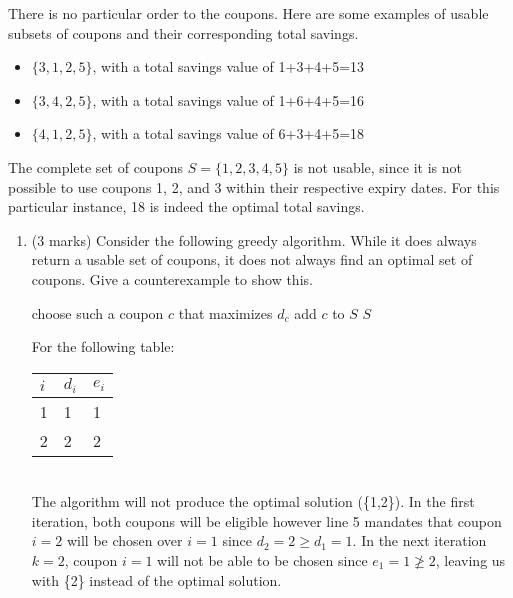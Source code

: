 \documentclass[11pt]{article}
\begin{document}
There is no particular order to the coupons. Here are some examples of usable subsets of coupons and their corresponding total savings. 
\begin{itemize}
    \item[] $\{ 3, 1, 2, 5\}$, with a total savings value of 1+3+4+5=13
    \item[] $\{ 3, 4, 2, 5\}$, with a total savings value of 1+6+4+5=16
    \item[] $\{ 4, 1, 2, 5\}$, with a total savings value of 6+3+4+5=18
\end{itemize}
The complete set of coupons $S = \{1,2,3,4,5\}$ is not usable, since it is not possible to use coupons 1, 2, and 3 within their respective expiry dates. For this particular instance, 18 is indeed the optimal total savings. 

\begin{enumerate}
    \item (3 marks) Consider the following greedy algorithm. While it does always return a usable set of coupons, it does not always find an optimal set of coupons. Give a counterexample to show this. 
    
    \begin{algorithmic}[1]
                    \State choose such a coupon $c$ that maximizes $d_c$
                    \State add $c$ to $S$
                \EndIf
            \EndFor
            \State \Return $S$
        \EndProcedure
    \end{algorithmic}
    
    \begin{soln}
    For the following table:
    \begin{table}[h]
    \centering
    \begin{tabular}{l|ll} 
    $i$ & $d_i$ & $e_i$ \\ \hline
    1 & 1 & 1 \\
    2 & 2 & 2 \\
    \end{tabular}
    \end{table}
    \\The algorithm will not produce the optimal solution (\{1,2\}). In the first iteration, both coupons will be eligible however line 5 mandates that coupon $i=2$ will be chosen over $i=1$ since $d_2=2 \geq d_1=1$. In the next iteration $k=2$, coupon $i=1$ will not be able to be chosen since $e_1=1 \ngeq 2$, leaving us with \{2\} instead of the optimal solution.
    \end{soln}
    

\end{enumerate}
\end{document}
